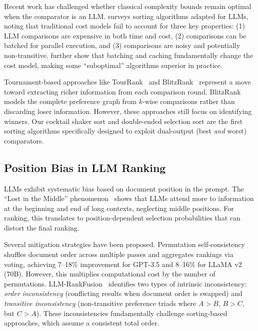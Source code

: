 Recent work has challenged whether classical complexity bounds remain optimal when the comparator is an LLM. \citet{sato2026survey} surveys sorting algorithms adapted for LLMs, noting that traditional cost models fail to account for three key properties: (1) LLM comparisons are expensive in both time and cost, (2) comparisons can be batched for parallel execution, and (3) comparisons are noisy and potentially non-transitive. \citet{wisznia2025optimal} further show that batching and caching fundamentally change the cost model, making some ``suboptimal'' algorithms superior in practice.

Tournament-based approaches like TourRank~\citep{chen2025tourrank} and BlitzRank~\citep{blitzrank2026} represent a move toward extracting richer information from each comparison round. BlitzRank models the complete preference graph from $k$-wise comparisons rather than discarding loser information. However, these approaches still focus on identifying winners. Our cocktail shaker sort and double-ended selection sort are the first sorting algorithms specifically designed to exploit dual-output (best \emph{and} worst) comparators.

\subsection{Position Bias in LLM Ranking}

LLMs exhibit systematic bias based on document position in the prompt. The ``Lost in the Middle'' phenomenon~\citep{liu2024lost} shows that LLMs attend more to information at the beginning and end of long contexts, neglecting middle positions. For ranking, this translates to position-dependent selection probabilities that can distort the final ranking.

Several mitigation strategies have been proposed. Permutation self-consistency~\citep{tang2024found} shuffles document order across multiple passes and aggregates rankings via voting, achieving 7--18\% improvement for GPT-3.5 and 8--16\% for LLaMA v2 (70B). However, this multiplies computational cost by the number of permutations. LLM-RankFusion~\citep{zeng2024llmrankfusion} identifies two types of intrinsic inconsistency: \emph{order inconsistency} (conflicting results when document order is swapped) and \emph{transitive inconsistency} (non-transitive preference triads where $A > B$, $B > C$, but $C > A$). These inconsistencies fundamentally challenge sorting-based approaches, which assume a consistent total order.

